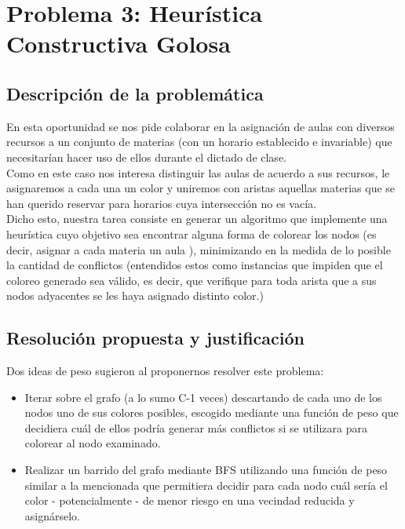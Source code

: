 \section{Problema 3: Heurística Constructiva Golosa}

\subsection{Descripción de la problemática}
En esta oportunidad se nos pide colaborar en la asignación de aulas con diversos recursos a un conjunto de materias (con un horario establecido e invariable) que necesitarían hacer uso de ellos durante el dictado de clase.\\
Como en este caso nos interesa distinguir las aulas de acuerdo a sus recursos, le asignaremos a cada una un color y uniremos con aristas aquellas materias que se han querido reservar para horarios cuya intersección no es vacía.\\
Dicho esto, nuestra tarea consiste en generar un algoritmo que implemente una heurística cuyo objetivo sea encontrar alguna forma de colorear los nodos (es decir, asignar a cada materia un aula ), minimizando en la medida de lo posible la cantidad de conflictos (entendidos estos como instancias que impiden que el coloreo generado sea válido, es decir, que verifique para toda arista que a sus nodos adyacentes se les haya asignado distinto color.) 


\subsection{Resolución propuesta y justificación}
Dos ideas de peso sugieron al proponernos resolver este problema:
\begin{itemize}
\item{Iterar sobre el grafo (a lo sumo C-1 veces) descartando de cada uno de los nodos uno de sus colores posibles, escogido mediante una función de peso que decidiera cuál de ellos podría generar más conflictos si se utilizara para colorear al nodo examinado.  }
\item{Realizar un barrido del grafo mediante BFS utilizando una función de peso similar a la mencionada que permitiera decidir para cada nodo cuál sería el color - potencialmente - de menor riesgo en una vecindad reducida y asignárselo. }
\end{itemize}

